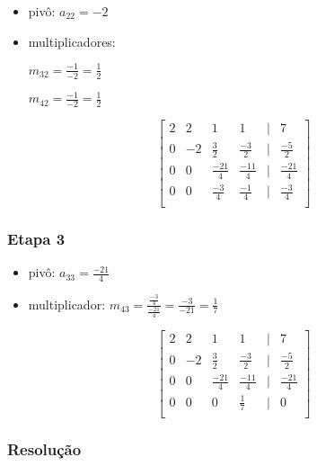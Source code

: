 \documentclass[a4paper]{article}
\begin{document}
\begin{itemize}
\item pivô: $a_{22} = -2$

\item multiplicadores:

$m_{32}=\frac{-1}{-2} = \frac{1}{2}$

$m_{42} = \frac{-1}{-2} = \frac{1}{2}$

\end{itemize}
\begin{displaymath}
  \begin{bmatrix}
    2 & 2 & 1 & 1 & | & 7\\
    0 & -2 & \frac{3}{2} & \frac{-3}{2} & | & \frac{-5}{2}\\
    0 & 0 & \frac{-21}{4} & \frac{-11}{4} & | & \frac{-21}{4}\\
    0 & 0 & \frac{-3}{4} & \frac{-1}{4} & | & \frac{-3}{4}\\
  \end{bmatrix}
\end{displaymath}

\subsubsection{Etapa 3}

\begin{itemize}
\item pivô: $a_{33} = \frac{-21}{4}$

\item multiplicador: $m_{43}=\frac{\frac{-3}{4}}{\frac{-21}{4}} =
\frac{-3}{-21} = \frac{1}{7}$

\end{itemize}
\begin{displaymath}
  \begin{bmatrix}
    2 & 2 & 1 & 1 & | & 7\\
    0 & -2 & \frac{3}{2} & \frac{-3}{2} & | & \frac{-5}{2}\\
    0 & 0 & \frac{-21}{4} & \frac{-11}{4} & | & \frac{-21}{4}\\
    0 & 0 & 0 & \frac{1}{7} & | & 0\\
  \end{bmatrix}
\end{displaymath}

\subsubsection{Resolução}
\end{document}
